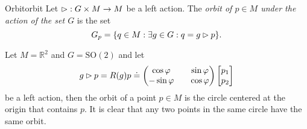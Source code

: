 \begin{definition}{Orbit}{orbit}
    Let \(\mathbin{\vartriangleright} : G \times M \to M\) be a left action. The \emph{orbit of \(p \in M\) under the action of the set \(G\)} is the set
    \begin{equation*}
        G_p = \{q \in M : \exists g \in G : q =  g \mathbin{\vartriangleright} p \}.
    \end{equation*}
\end{definition}
\begin{example}
    Let \(M = \mathbb{R}^2\) and \(G = \mathrm{SO}(2)\) and let
    \begin{equation*}
        g \mathbin{\vartriangleright} p = R(g)p \doteq \begin{pmatrix}
            \cos \varphi && \sin \varphi\\
            -\sin \varphi && \cos \varphi
            \end{pmatrix} \begin{bmatrix}
            p_1 \\ p_2
        \end{bmatrix}
    \end{equation*}
    be a left action, then the orbit of a point \(p \in M\) is the circle centered at the origin that contains \(p\). It is clear that any two points in the same circle have the same orbit.
\end{example}

